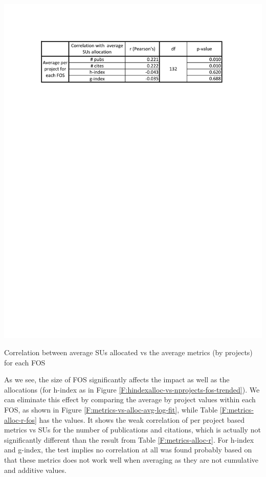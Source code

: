 \documentclass{sig-alternate}
\begin{document}
\begin{table}[htb] 
  \centering 
    \includegraphics[width=1.0\columnwidth]{images/metrics_alloc_r_fos.pdf} 
  \caption{Correlation between average SUs allocated vs the average metrics (by projects) for each FOS}\label{F:metrics-alloc-r-fos} 
\end{table} 
 
As we see, the size of FOS significantly affects the impact as well as the allocations (for h-index as in Figure \ref{F:hindexalloc-vs-nprojects-fos-trended}). We can eliminate this effect by comparing the average by project values within each FOS, as shown in Figure \ref{F:metrics-vs-alloc-avg-log-fit}, while Table \ref{F:metrics-alloc-r-fos} has the values. It shows the weak correlation of per project based metrics vs SUs for the number of publications and citations, which is actually not significantly different than the result from Table \ref{F:metrics-alloc-r}. For h-index and g-index, the test implies no correlation at all was found probably based on that these metrics does not work well when averaging as they are not cumulative and additive values. 
 
\end{document}
